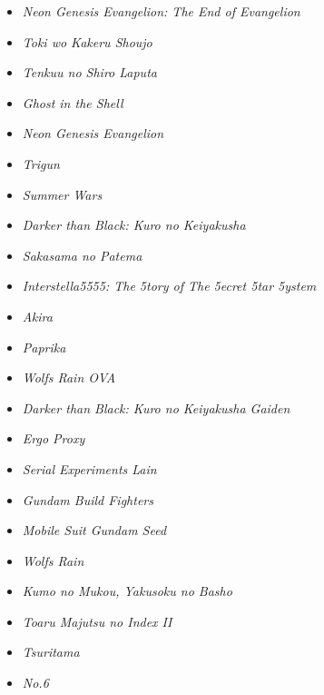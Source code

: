 \documentclass[11pt,a4paper]{article}
\begin{document}
\begin{enumerate}
\begin{itemize}
\item  \emph{       Neon Genesis Evangelion: The End of Evangelion }     
\item  \emph{       Toki wo Kakeru Shoujo                           }    
\item  \emph{       Tenkuu no Shiro Laputa                           }   
\item  \emph{       Ghost in the Shell                                }  
\item  \emph{       Neon Genesis Evangelion                          }   
\item  \emph{       Trigun                                            }  
\item  \emph{       Summer Wars                                       }  
\item  \emph{       Darker than Black: Kuro no Keiyakusha              } 
\item  \emph{       Sakasama no Patema                                  }
\item  \emph{       Interstella5555: The 5tory of The 5ecret 5tar 5ystem}
\item  \emph{       Akira                                               }
\item  \emph{       Paprika                                             }
\item  \emph{       Wolfs Rain OVA                               } 
\item  \emph{       Darker than Black: Kuro no Keiyakusha Gaiden   }     
\item  \emph{       Ergo Proxy                                      }    
\item  \emph{       Serial Experiments Lain                          }   
\item  \emph{       Gundam Build Fighters                             }  
\item  \emph{       Mobile Suit Gundam Seed                            } 
\item  \emph{       Wolfs Rain                                    }
\item  \emph{       Kumo no Mukou, Yakusoku no Basho                }    
\item  \emph{       Toaru Majutsu no Index II                        }   
\item  \emph{       Tsuritama                                         }  
\item  \emph{       No.6                                               } 

\end{itemize}
\end{enumerate}
\end{document}
